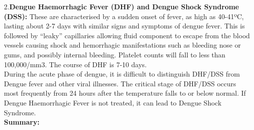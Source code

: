 \documentclass[11pt]{exam}
\begin{document}
\begin{questions}
2.\textbf{Dengue Haemorrhagic Fever (DHF) and Dengue Shock Syndrome (DSS):} These are
characterised by a sudden onset of fever, as high as 40-41ºC, lasting about
2-7 days with similar signs and symptoms of dengue fever. This is followed by
“leaky” capillaries allowing fluid component to escape from the blood vessels
causing shock and hemorrhagic manifestations such as bleeding nose or gums,
and possibly internal bleeding. Platelet counts will fall to less than 100,000/mm3.
The course of DHF is 7-10 days.\\
During the acute phase of dengue, it is difficult to distinguish DHF/DSS from
Dengue fever and other viral illnesses. The critical stage of DHF/DSS occurs most
frequently from 24 hours after the temperature falls to or below normal. If Dengue
Haemorrhagic Fever is not treated, it can lead to Dengue Shock Syndrome.\\

\textbf{Summary:} \\
\\ \\


\end{questions}
\end{document}
